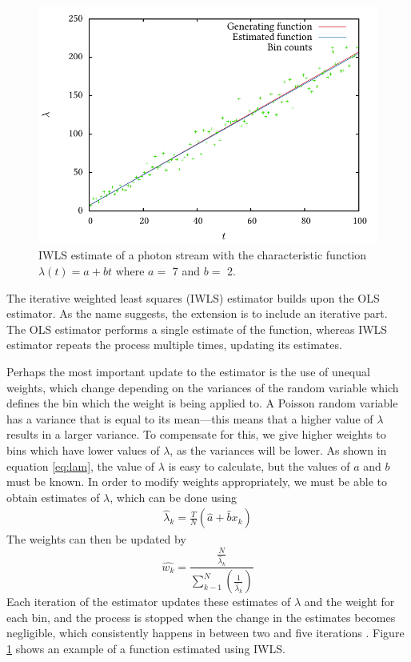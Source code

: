 \documentclass[a4paper,11pt]{article}
\begin{document}
    \begin{figure}[h]
    \includegraphics{lineest}
    \caption{IWLS estimate of a photon stream with the characteristic function
    $\lambda(t)=a+bt$ where $a=$ 7 and $b=$ 2.}
    \label{linefig}
    \end{figure}
    The iterative weighted least squares (IWLS) estimator builds upon the OLS
    estimator. As the name suggests, the extension is to include an iterative
    part. The OLS estimator performs a single estimate of the function, whereas
    IWLS estimator repeats the process multiple times, updating its estimates.

    Perhaps the most important update to the estimator is the use of unequal
    weights, which change depending on the variances of the random variable
    which defines the bin which the weight is being applied to. A Poisson random
    variable has a variance that is equal to its mean---this means that a higher
    value of $\lambda$ results in a larger variance. To compensate for this,
    we give higher weights to bins which have lower values of $\lambda$, as the
    variances will be lower. As shown in equation \eqref{eq:lam}, the value of
    $\lambda$ is easy to calculate, but the values of $a$ and $b$ must be
    known. In order to modify weights appropriately, we must be able to obtain
    estimates of $\lambda$, which can be done using \cite{massey1996estimating}
    \begin{align}
    \hat{\lambda}_k=\frac{T}{N}(\hat{a}+\hat{b}x_k)
    \end{align}
    The weights can then be updated by
    \begin{equation}
    \hat{w_k}=\frac{\displaystyle \frac{N}{\hat{\lambda}_k}}{\displaystyle \sum_{k-1}^N\left(\frac{1}{\hat{\lambda}_k}\right)}
    \end{equation}
    Each iteration of the estimator updates these estimates of $\lambda$ and the
    weight for each bin, and the process is stopped when the change in the
    estimates becomes negligible, which consistently happens in between two and
    five iterations \cite{massey1996estimating}. Figure \ref{linefig} shows an
    example of a function estimated using IWLS.
\end{document}

